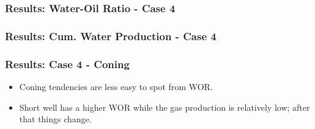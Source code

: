 
\begin{frame}
    \frametitle{Results: Water-Oil Ratio - Case 4}
    \centerline{}
\end{frame}

\begin{frame}
    \frametitle{Results: Cum. Water Production - Case 4}
    \centerline{}
\end{frame}

\begin{frame}
    \frametitle{Results: Case 4 - Coning}
    \begin{itemize}
        \item Coning tendencies are less easy to spot from WOR.
        \item Short well has a higher WOR while the gas production is relatively low; after that things change.
    \end{itemize}
\end{frame}
